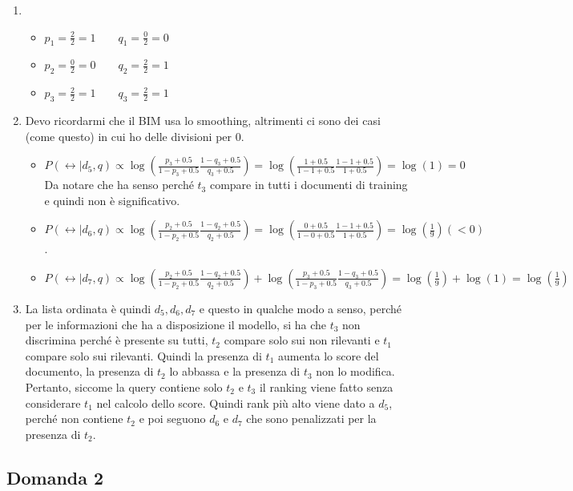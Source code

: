 \begin{enumerate}
	\item 
	\begin{itemize}
		\item $p_1 = \frac{2}{2} = 1 \qquad q_1 = \frac{0}{2} = 0$
		\item $p_2 = \frac{0}{2} = 0 \qquad q_2 = \frac{2}{2} = 1$
		\item $p_3 = \frac{2}{2} = 1 \qquad q_3 = \frac{2}{2} = 1$
	\end{itemize}
	\item Devo ricordarmi che il BIM usa lo smoothing, altrimenti ci sono dei casi (come questo) in cui ho delle divisioni per 0.
	\begin{itemize}
		\item $P(\rel | d_5, q) \propto \log(\frac{p_3+0.5}{1-p_3+0.5} \frac{1-q_3+0.5}{q_3+0.5}) = \log(\frac{1+0.5}{1-1 +0.5} \frac{1-1+0.5}{1+0.5}) = \log(1) = 0 $ Da notare che ha senso perché $t_3$ compare in tutti i documenti di training e quindi non è significativo.
		\item $P(\rel | d_6, q) \propto \log(\frac{p_2+0.5}{1-p_2+0.5}\frac{1-q_2+0.5}{q_2+0.5}) = \log(\frac{0+0.5}{1-0+0.5}\frac{1-1+0.5}{1+0.5}) = \log(\frac{1}{9}) (< 0)$. 
		\item $P(\rel | d_7, q) \propto \log(\frac{p_2+0.5}{1-p_2+0.5}\frac{1-q_2+0.5}{q_2+0.5}) +\log(\frac{p_3+0.5}{1-p_3+0.5}\frac{1-q_3+0.5}{q_3+0.5}) = \log(\frac{1}{9}) + \log(1)= \log(\frac{1}{9})$
	\end{itemize}
	\item La lista ordinata è quindi $d_5, d_6, d_7$ e questo in qualche modo a senso, perché per le informazioni che ha a disposizione il modello, si ha che $t_3$ non discrimina perché è presente su tutti, $t_2$ compare solo sui non rilevanti e $t_1$ compare solo sui rilevanti. Quindi la presenza di $t_1$ aumenta lo score del documento, la presenza di $t_2$ lo abbassa e la presenza di $t_3$ non lo modifica. 
	Pertanto, siccome la query contiene solo $t_2$ e $t_3$ il ranking viene fatto senza considerare $t_1$ nel calcolo dello score. Quindi rank più alto viene dato a $d_5$, perché non contiene $t_2$ e poi seguono $d_6$ e $d_7$ che sono penalizzati per la presenza di $t_2$.
\end{enumerate}


\subsection{Domanda 2}

